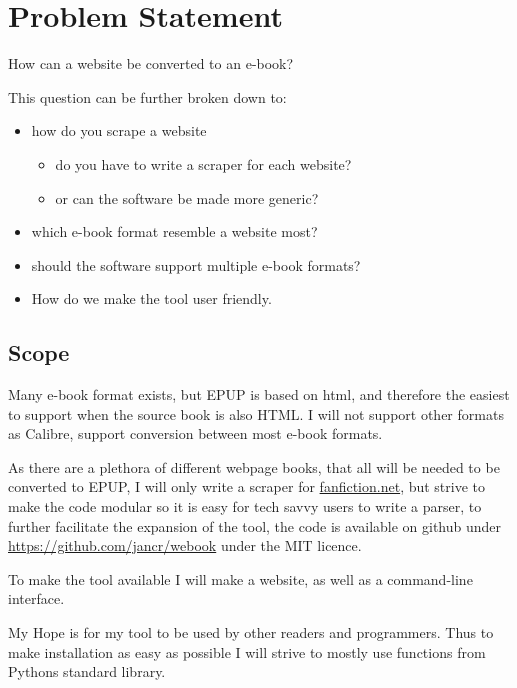 \documentclass[]{report}   %
\begin{document}
\section{Problem Statement}
How can a website be converted to an e-book?

This question can be further broken down to:
\begin{itemize}
    \item how do you scrape a website
    \begin{itemize}
        \item do you have to write a scraper for each website?
		\item or can the software be made more generic?
    \end{itemize}
    \item which e-book format resemble a website most?
    \item should the software support multiple e-book formats?
    \item How do we make the tool user friendly.
\end{itemize}

\subsection{Scope}
Many e-book format exists, but EPUP is based on html, and therefore the easiest
to support when the source book is also HTML. I will not support other formats
as Calibre\cite{calibre}, support conversion between most
e-book formats.

As there are a plethora of different webpage books, that all will be needed to
be converted to EPUP, I will only write a scraper for \url{fanfiction.net}, but
strive to make the code modular so it is easy for tech savvy users to write a
parser, to further facilitate the expansion of the tool, the code is available
on github under \url{https://github.com/jancr/webook} under the MIT licence. 

To make the tool available I will make a website, as well as a command-line
interface.

My Hope is for my tool to be used by other readers and programmers. Thus to
make installation as easy as possible I will strive to mostly use functions
from Pythons standard library.

\end{document}
